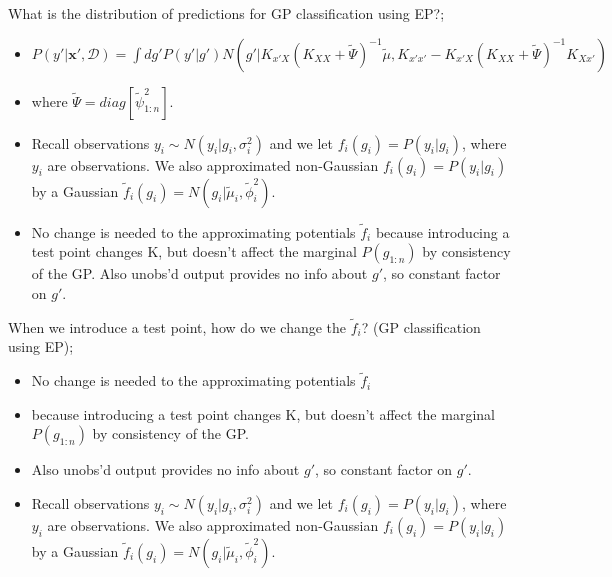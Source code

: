 \documentclass{article}
\begin{document}
What is the distribution of predictions for GP classification using EP?; \begin{itemize}
    \item $P(y'|\mathbf{x'}, \mathcal{D}) = \int dg' P(y'|g')N(g' | K_{x'X}(K_{XX}+\tilde{\Psi})^{-1}\tilde{\mu}, K_{x'x'} - K_{x'X}(K_{XX}+\tilde{\Psi})^{-1}K_{Xx'})$
    \item where $\tilde{\Psi} = diag[\tilde{\psi}^2_{1:n}]$.
    \item Recall observations $y_i \sim N(y_i | g_i, \sigma^2_i)$ and we let $f_i(g_i) = P(y_i|g_i)$, where $y_i$ are observations. We also approximated non-Gaussian $f_i(g_i) = P(y_i|g_i)$ by a Gaussian $\tilde{f}_i(g_i) = N(g_i | \tilde{\mu}_i, \tilde{\phi}^2_i)$.
    \item No change is needed to the approximating potentials $\tilde{f}_i$ because introducing a test point changes K, but doesn't affect the marginal $P(g_{1:n})$ by consistency of the GP. Also unobs'd output provides no info about $g'$, so constant factor on $g'$.
\end{itemize}

When we introduce a test point, how do we change the $\tilde{f}_i$? (GP classification using EP); \begin{itemize}
    \item No change is needed to the approximating potentials $\tilde{f}_i$ 
    \item because introducing a test point changes K, but doesn't affect the marginal $P(g_{1:n})$ by consistency of the GP. \item Also unobs'd output provides no info about $g'$, so constant factor on $g'$.
    \item Recall observations $y_i \sim N(y_i | g_i, \sigma^2_i)$ and we let $f_i(g_i) = P(y_i|g_i)$, where $y_i$ are observations. We also approximated non-Gaussian $f_i(g_i) = P(y_i|g_i)$ by a Gaussian $\tilde{f}_i(g_i) = N(g_i | \tilde{\mu}_i, \tilde{\phi}^2_i)$.
\end{itemize}


\end{document}
